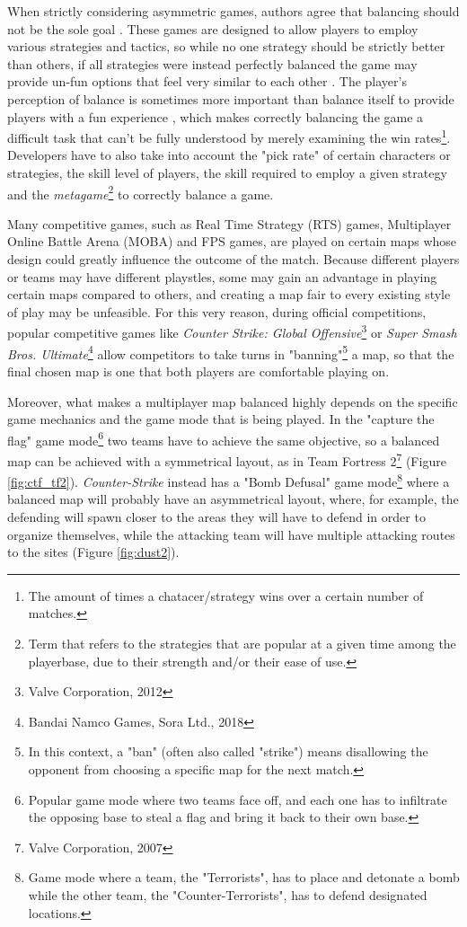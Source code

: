 \documentclass{Configuration_Files/PoliMi3i_thesis}
\begin{document}
When strictly considering asymmetric games, authors agree that balancing should not be the sole goal \cite{sirlin_balancing_2014} \cite{portwnow_perfect_2012} \cite{brown_how_2019}. These games are designed to allow players to employ various strategies and tactics, so while no one strategy should be strictly better than others, if all strategies were instead perfectly balanced the game may provide un-fun options that feel very similar to each other \cite{sakurai_amplify_2024}. The player's perception of balance is sometimes more important than balance itself to provide players with a fun experience \cite{brown_how_2019}, which makes correctly balancing the game a difficult task that can't be fully understood by merely examining the win rates\footnote{The amount of times a chatacer/strategy wins over a certain number of matches.}. Developers have to also take into account the "pick rate" of certain characters or strategies, the skill level of players, the skill required to employ a given strategy and the \textit{metagame}\footnote{Term that refers to the strategies that are popular at a given time among the playerbase, due to their strength and/or their ease of use.} to correctly balance a game. \cite{brown_how_2019} 

Many competitive games, such as Real Time Strategy (RTS) games, Multiplayer Online Battle Arena (MOBA) and FPS games, are played on certain maps whose design could greatly influence the outcome of the match. Because different players or teams may have different playstles, some may gain an advantage in playing certain maps compared to others, and creating a map fair to every existing style of play may be unfeasible. For this very reason, during official competitions, popular competitive games like \textit{Counter Strike: Global Offensive}\footnote{Valve Corporation, 2012} or \textit{Super Smash Bros. Ultimate}\footnote{Bandai Namco Games, Sora Ltd., 2018} allow competitors to take turns in "banning"\footnote{In this context, a "ban" (often also called "strike") means disallowing the opponent from choosing a specific map for the next match.} a map, so that the final chosen map is one that both players are comfortable playing on.

Moreover, what makes a multiplayer map balanced highly depends on the specific game mechanics and the game mode that is being played. In the "capture the flag" game mode\footnote{Popular game mode where two teams face off, and each one has to infiltrate the opposing base to steal a flag and bring it back to their own base.} two teams have to achieve the same objective, so a balanced map can be achieved with a symmetrical layout, as in Team Fortress 2\footnote{Valve Corporation, 2007} (Figure \ref{fig:ctf_tf2}). \textit{Counter-Strike} instead has a "Bomb Defusal" game mode\footnote{Game mode where a team, the "Terrorists", has to place and detonate a bomb while the other team, the "Counter-Terrorists", has to defend designated locations.} where a balanced map will probably have an asymmetrical layout, where, for example, the defending will spawn closer to the areas they will have to defend in order to organize themselves, while the attacking team will have multiple attacking routes to the sites (Figure \ref{fig:dust2}).
\end{document}
